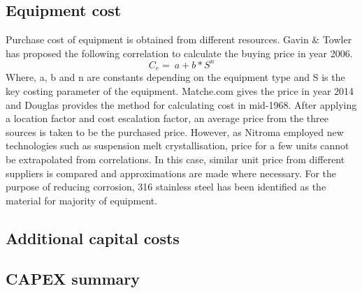 \subsection{Equipment cost}
Purchase cost of equipment is obtained from different resources. Gavin & Towler\cite{sinnott_chemical_2020} has proposed the following correlation to calculate the buying price in year 2006.
\begin{equation}
    C_{e}=\ a+b*S^n
\end{equation}
Where, a, b and n are constants depending on the equipment type and S is the key costing parameter of the equipment. Matche.com gives the price in year 2014 and Douglas provides the method for calculating cost in mid-1968. After applying a location factor and cost escalation factor, an average price from the three sources is taken to be the purchased price. However, as Nitroma employed new technologies such as suspension melt crystallisation, price for a few units cannot be extrapolated from correlations. In this case, similar unit price from different suppliers is compared and approximations are made where necessary. For the purpose of reducing corrosion, 316 stainless steel has been identified as the material for majority of equipment.




\subsection{Additional capital costs}
\subsection{CAPEX summary}